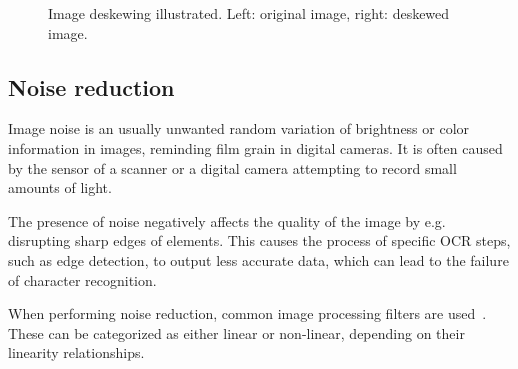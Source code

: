 \begin{figure}
\caption{Image deskewing illustrated. Left: original image, right: deskewed image.}
\label{fig:preprocessDeskewing}
\end{figure}

\subsection{Noise reduction}

Image noise is an usually unwanted random variation of brightness or color information in images, reminding film grain in digital cameras. It is often caused by the sensor of a scanner or a digital camera attempting to record small amounts of light. 

The presence of noise negatively affects the quality of the image by e.g. disrupting sharp edges of elements. This causes the process of specific OCR steps, such as edge detection, to output less accurate data, which can lead to the failure of character recognition.

When performing noise reduction, common image processing filters are used~\citep{denoisingTechniques}. These can be categorized as either linear or non-linear, depending on their linearity relationships.

